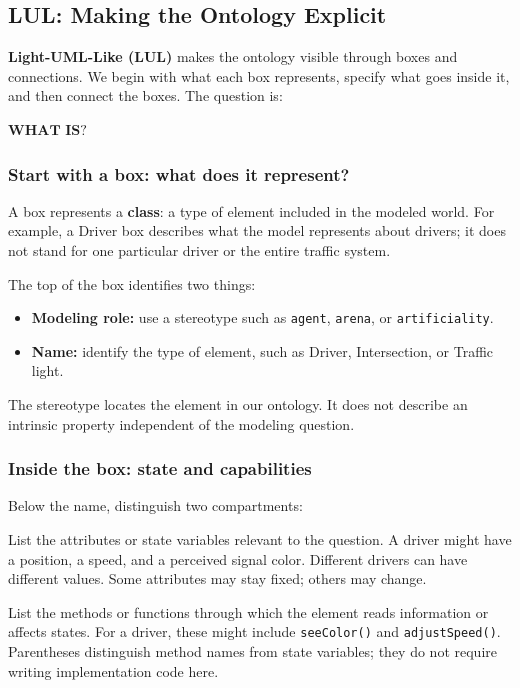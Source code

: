 \documentclass[11pt,a4paper]{article}
\newcommand{\stereo}[1]{\texttt{\guillemotleft #1\guillemotright}}
\newenvironment{fitdisplay}{\par\medskip\noindent\begin{lrbox}{\displaybox}$\displaystyle}{%
$\end{lrbox}\makebox[\linewidth][c]{\ifdim\wd\displaybox>\linewidth\resizebox{\linewidth}{!}{\usebox{\displaybox}}\else\usebox{\displaybox}\fi}\par\medskip}
\begin{document}
\subsection{LUL: Making the Ontology Explicit}

\textbf{Light-UML-Like (LUL)} makes the ontology visible through boxes and connections. We begin with what each box represents, specify what goes inside it, and then connect the boxes. The question is:

\begin{fitdisplay}
\boxed{\textbf{WHAT IS?}}
\end{fitdisplay}

\subsubsection{Start with a box: what does it represent?}

A box represents a \textbf{class}: a type of element included in the modeled world. For example, a Driver box describes what the model represents about drivers; it does not stand for one particular driver or the entire traffic system.

The top of the box identifies two things:
\begin{itemize}
\item \textbf{Modeling role:} use a stereotype such as \stereo{agent}, \stereo{arena}, or \stereo{artificiality}.
\item \textbf{Name:} identify the type of element, such as Driver, Intersection, or Traffic light.
\end{itemize}
The stereotype locates the element in our ontology. It does not describe an intrinsic property independent of the modeling question.

\subsubsection{Inside the box: state and capabilities}

Below the name, distinguish two compartments:
\begin{description}[style=nextline,leftmargin=0pt,labelindent=0pt,labelsep=0pt,labelwidth=0pt,itemindent=0pt,itemsep=5pt]
\item[State: what can be described about the element?] List the attributes or state variables relevant to the question. A driver might have a position, a speed, and a perceived signal color. Different drivers can have different values. Some attributes may stay fixed; others may change.
\item[Capabilities: what can the element do?] List the methods or functions through which the element reads information or affects states. For a driver, these might include \texttt{seeColor()} and \texttt{adjustSpeed()}. Parentheses distinguish method names from state variables; they do not require writing implementation code here.
\end{description}
\end{document}
